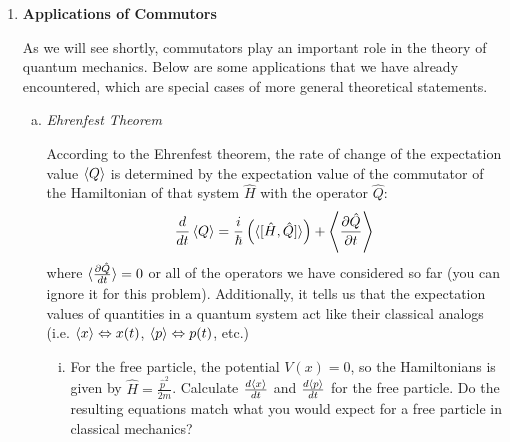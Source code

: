 \documentclass[10pt,letterpaper]{article}
\begin{document}
\begin{enumerate}
\begin{enumerate}[a)]
\color{violet}
Some mixed state where $\psi(q) \neq \psi_{i}(q) + \psi_{j}(q)$ would have a non-zero current and voltage, because pure states have symmetrical wavefunctions, so it'll average out at the origin. 
\color{black}

\end{enumerate}

\item \textbf{Applications of Commutors}

As we will see shortly, commutators play an important role in the theory of quantum mechanics. Below are some applications that we have already encountered, which are special cases of more general theoretical statements.

\begin{enumerate}[a)]

\item \textit{Ehrenfest Theorem}

According to the Ehrenfest theorem, the rate of change of the expectation value $\braket{Q}$ is determined by the expectation value of the commutator of the Hamiltonian of that system $\hat{H}$ with the operator $\hat{Q}$:
$$\frac{d}{dt}\braket{Q} = \frac{i}{\hbar}\left(\braket{[\hat{H}, \hat{Q}]}\right) + \left\langle \frac{\partial \hat{Q}}{\partial t} \right\rangle$$
where $\braket{\frac{\partial \hat{Q}}{dt}} = 0$ or all of the operators we have considered so far (you can ignore it for this problem). Additionally, it tells us that the expectation values of quantities in a quantum system act like their classical analogs (i.e. $\braket{x} \Leftrightarrow x(t)$, $\braket{p} \Leftrightarrow p(t)$, etc.)

\begin{enumerate}[i)]

\item For the free particle, the potential $V(x) = 0$, so the Hamiltonians is given by $\hat{H} = \frac{\hat{p}^{2}}{2m}$. Calculate $\frac{d\braket{x}}{dt}$ and $\frac{d\braket{p}}{dt}$ for the free particle. Do the resulting equations match what you would expect for a free particle in classical mechanics?


\end{enumerate}
\end{enumerate}
\end{enumerate}
\end{document}
